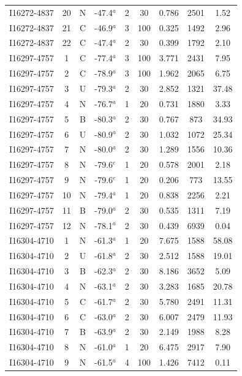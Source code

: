 \begin{table}
\begin{tabular}{ccccccccc}
I16272-4837 & 20 & N & -47.4$^{a}$ & 2 & 30 & 0.786 & 2501 & 1.52 \\
I16272-4837 & 21 & C & -46.9$^{a}$ & 3 & 100 & 0.325 & 1492 & 2.96 \\
I16272-4837 & 22 & C & -47.4$^{a}$ & 2 & 30 & 0.399 & 1792 & 2.10 \\
I16297-4757 & 1 & C & -77.4$^{a}$ & 3 & 100 & 3.771 & 2431 & 7.95 \\
I16297-4757 & 2 & C & -78.9$^{a}$ & 3 & 100 & 1.962 & 2065 & 6.75 \\
I16297-4757 & 3 & U & -79.3$^{a}$ & 2 & 30 & 2.852 & 1321 & 37.48 \\
I16297-4757 & 4 & N & -76.7$^{a}$ & 1 & 20 & 0.731 & 1880 & 3.33 \\
I16297-4757 & 5 & B & -80.3$^{a}$ & 2 & 30 & 0.767 & 873 & 34.93 \\
I16297-4757 & 6 & U & -80.9$^{a}$ & 2 & 30 & 1.032 & 1072 & 25.34 \\
I16297-4757 & 7 & N & -80.0$^{a}$ & 2 & 30 & 1.289 & 1556 & 10.36 \\
I16297-4757 & 8 & N & -79.6$^{e}$ & 1 & 20 & 0.578 & 2001 & 2.18 \\
I16297-4757 & 9 & N & -79.6$^{e}$ & 1 & 20 & 0.206 & 773 & 13.55 \\
I16297-4757 & 10 & N & -79.4$^{a}$ & 1 & 20 & 0.838 & 2256 & 2.21 \\
I16297-4757 & 11 & B & -79.0$^{a}$ & 2 & 30 & 0.535 & 1311 & 7.19 \\
I16297-4757 & 12 & N & -78.1$^{a}$ & 2 & 30 & 0.439 & 6939 & 0.04 \\
I16304-4710 & 1 & N & -61.3$^{a}$ & 1 & 20 & 7.675 & 1588 & 58.08 \\
I16304-4710 & 2 & U & -61.8$^{a}$ & 2 & 30 & 2.512 & 1588 & 19.01 \\
I16304-4710 & 3 & B & -62.3$^{a}$ & 2 & 30 & 8.186 & 3652 & 5.09 \\
I16304-4710 & 4 & N & -63.1$^{a}$ & 2 & 30 & 3.283 & 1685 & 20.78 \\
I16304-4710 & 5 & C & -61.7$^{a}$ & 2 & 30 & 5.780 & 2491 & 11.31 \\
I16304-4710 & 6 & C & -63.0$^{a}$ & 2 & 30 & 6.007 & 2479 & 11.93 \\
I16304-4710 & 7 & B & -63.9$^{a}$ & 2 & 30 & 2.149 & 1988 & 8.28 \\
I16304-4710 & 8 & N & -61.0$^{a}$ & 1 & 20 & 6.475 & 2917 & 7.90 \\
I16304-4710 & 9 & N & -61.5$^{a}$ & 4 & 100 & 1.426 & 7412 & 0.11 \\

\end{tabular}
\end{table}
